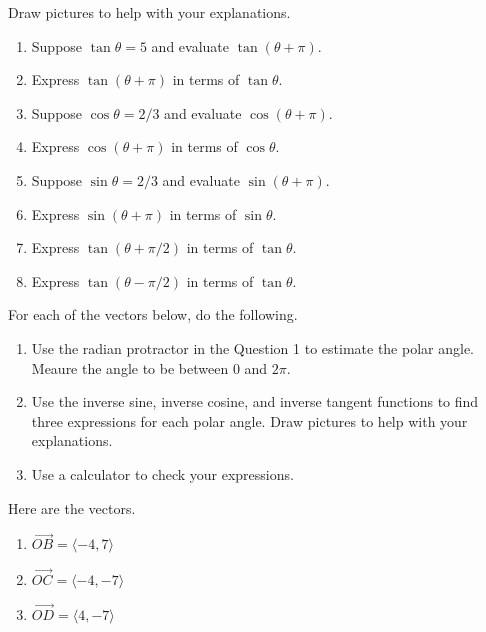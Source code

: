 \documentclass{ximera}
\begin{document}
\begin{question} \label{Q89DfegvVDE}
Draw pictures to help with your explanations.
\begin{enumerate}
\item Suppose $\tan \theta = 5$ and evaluate $\tan(\theta + \pi)$.

\item Express $\tan(\theta+\pi)$ in terms of $\tan \theta$.

\item Suppose $\cos \theta = 2/3$ and evaluate $\cos(\theta + \pi)$.

\item Express $\cos(\theta+\pi)$ in terms of $\cos \theta$.

\item Suppose $\sin \theta = 2/3$ and evaluate $\sin(\theta + \pi)$.

\item Express $\sin(\theta+\pi)$ in terms of $\sin \theta$.

\item Express $\tan(\theta+\pi/2)$ in terms of $\tan \theta$.

\item Express $\tan(\theta -\pi/2)$ in terms of $\tan \theta$.
\end{enumerate}
\end{question}



\begin{question}  \label{Q9DDFegbb}
For each of the vectors below, do the following.

\begin{enumerate}
\item Use the radian protractor in the Question 1 to estimate the polar angle. Meaure the angle to be between $0$ and $2\pi$.

\item Use the inverse sine, inverse cosine, and inverse tangent functions to find three expressions for each polar angle. Draw pictures to help with your explanations.

\item Use a calculator to check your expressions.

\end{enumerate}

Here are the vectors.

\begin{enumerate}
\item $\overrightarrow{OB} = \langle -4, 7 \rangle$

\item $\overrightarrow{OC} = \langle -4, -7 \rangle$

\item $\overrightarrow{OD} = \langle 4, -7 \rangle$

\end{enumerate}
\end{question}
\end{document}

